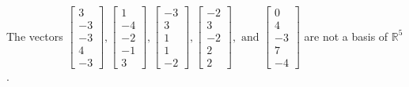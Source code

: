 \begin{exercise}
\begin{exerciseStatement}
  \end{exerciseStatement}
  \begin{exerciseAnswer}
   The vectors \(\left[\begin{array}{r}
3 \\
-3 \\
-3 \\
4 \\
-3
\end{array}\right] , \left[\begin{array}{r}
1 \\
-4 \\
-2 \\
-1 \\
3
\end{array}\right] , \left[\begin{array}{r}
-3 \\
3 \\
1 \\
1 \\
-2
\end{array}\right] , \left[\begin{array}{r}
-2 \\
3 \\
-2 \\
2 \\
2
\end{array}\right] , \text{ and } \left[\begin{array}{r}
0 \\
4 \\
-3 \\
7 \\
-4
\end{array}\right]\) 
  	 are not  a basis of \(\mathbb{R}^5\).
  


  \end{exerciseAnswer}
\end{exercise}